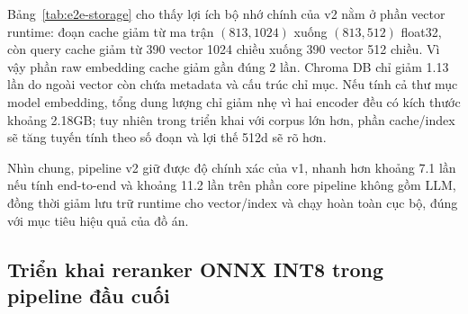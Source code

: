 \documentclass[../DoAn.tex]{subfiles}
\begin{document}
\begin{table}[H]
    \centering
    \caption{Dung lượng lưu trữ của embedding cache và index trong pipeline đầu cuối}
    \label{tab:e2e-storage}
    {\small
    \setlength{\tabcolsep}{4pt}
    }
\end{table}

Bảng~\ref{tab:e2e-storage} cho thấy lợi ích bộ nhớ chính của v2 nằm ở phần vector runtime: đoạn cache giảm từ ma trận $(813, 1024)$ xuống $(813, 512)$ float32, còn query cache giảm từ 390 vector 1024 chiều xuống 390 vector 512 chiều. Vì vậy phần raw embedding cache giảm gần đúng 2 lần. Chroma DB chỉ giảm 1.13 lần do ngoài vector còn chứa metadata và cấu trúc chỉ mục. Nếu tính cả thư mục model embedding, tổng dung lượng chỉ giảm nhẹ vì hai encoder đều có kích thước khoảng 2.18GB; tuy nhiên trong triển khai với corpus lớn hơn, phần cache/index sẽ tăng tuyến tính theo số đoạn và lợi thế 512d sẽ rõ hơn.

Nhìn chung, pipeline v2 giữ được độ chính xác của v1, nhanh hơn khoảng 7.1 lần nếu tính end-to-end và khoảng 11.2 lần trên phần core pipeline không gồm LLM, đồng thời giảm lưu trữ runtime cho vector/index và chạy hoàn toàn cục bộ, đúng với mục tiêu hiệu quả của đồ án.

\subsection{Triển khai reranker ONNX INT8 trong pipeline đầu cuối}
\label{subsection:e2e-onnx-int8}
\end{document}
